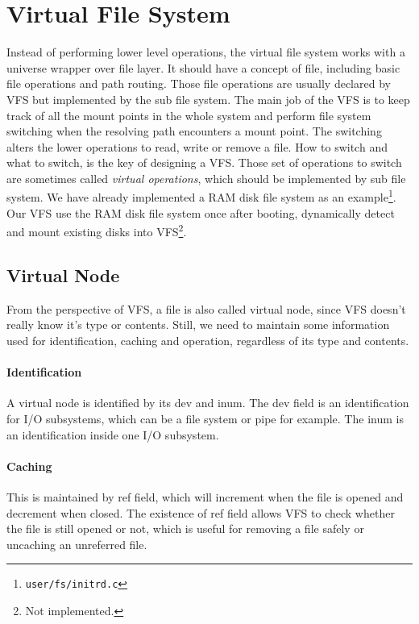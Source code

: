 \documentclass[11pt,a4paper]{article}
\begin{document}
\section{Virtual File System}
Instead of performing lower level operations, the virtual file system works with a universe wrapper over file layer. It should have a concept of file, including basic file operations and path routing. Those file operations are usually declared by VFS but implemented by the sub file system. The main job of the VFS is to keep track of all the mount points in the whole system and perform file system switching when the resolving path encounters a mount point. The switching alters the lower operations to read, write or remove a file. How to switch and what to switch, is the key of designing a VFS. Those set of operations to switch are sometimes called \emph{virtual operations}, which should be implemented by sub file system. We have already implemented a RAM disk file system as an example\footnote{\texttt{user/fs/initrd.c}}. Our VFS use the RAM disk file system once after booting, dynamically detect and mount existing disks into VFS\footnote{Not implemented.}. 


\subsection{Virtual Node}
From the perspective of VFS, a file is also called virtual node, since VFS doesn't really know it's type or contents. Still, we need to maintain some information used for identification, caching and operation, regardless of its type and contents. 

\paragraph{Identification}
A virtual node is identified by its dev and inum. The dev field is an identification for I/O subsystems, which can be a file system or pipe for example. The inum is an identification inside one I/O subsystem. 

\paragraph{Caching}
This is maintained by ref field, which will increment when the file is opened and decrement when closed. The existence of ref field allows VFS to check whether the file is still opened or not, which is useful for removing a file safely or uncaching an unreferred file. 
\end{document}
